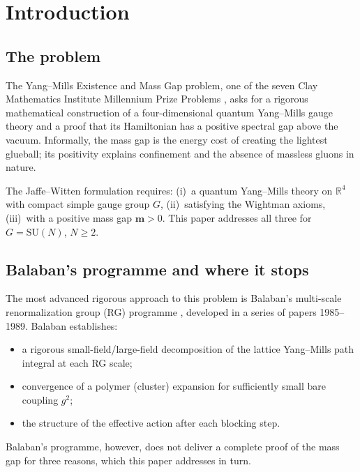 \documentclass[11pt,a4paper]{amsart}
\theoremstyle{definition}
\newcommand{\SU}{\mathrm{SU}}
\newcommand{\R}{\mathbb{R}}
\begin{document}
\tableofcontents

\section{Introduction}
\label{sec:intro}

\subsection{The problem}

The Yang--Mills Existence and Mass Gap problem, one of the seven Clay
Mathematics Institute Millennium Prize Problems \cite{JaffeWitten}, asks for
a rigorous mathematical construction of a four-dimensional quantum Yang--Mills
gauge theory and a proof that its Hamiltonian has a positive spectral gap
above the vacuum.  Informally, the mass gap is the energy cost of creating the
lightest glueball; its positivity explains confinement and the absence of
massless gluons in nature.

The Jaffe--Witten formulation \cite{JaffeWitten} requires: (i)~a quantum
Yang--Mills theory on $\R^4$ with compact simple gauge group $G$,
(ii)~satisfying the Wightman axioms, (iii)~with a positive mass gap
$\mathbf{m} > 0$.  This paper addresses all three for $G = \SU(N)$, $N \ge 2$.

\subsection{Balaban's programme and where it stops}

The most advanced rigorous approach to this problem is Balaban's multi-scale
renormalization group (RG) programme
\cite{B85,B87,B88,B89a,B89b}, developed in a series of papers 1985--1989.
Balaban establishes:
\begin{itemize}
  \item a rigorous small-field/large-field decomposition of the lattice
        Yang--Mills path integral at each RG scale;
  \item convergence of a polymer (cluster) expansion for sufficiently small
        bare coupling $g^2$;
  \item the structure of the effective action after each blocking step.
\end{itemize}
Balaban's programme, however, does not deliver a complete proof of the mass
gap for three reasons, which this paper addresses in turn.
\end{document}
